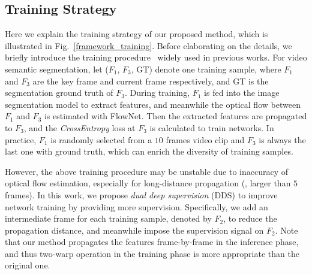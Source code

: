 \documentclass[journal]{IEEEtran}
\begin{document}
\subsection{Training Strategy}

Here we explain the training strategy of our proposed method, which is illustrated in Fig.~\ref{framework_training}. Before elaborating on the details, we briefly introduce the training procedure~\cite{zhu2017deep} widely used in previous works. For video semantic segmentation, let ($F_{1}$, $F_{3}$, GT) denote one training sample, where $F_{1}$ and $F_{3}$ are the key frame and current frame respectively, and GT is the segmentation ground truth of $F_{3}$. During training, $F_{1}$ is fed into the image segmentation model to extract features, and meanwhile the optical flow between $F_{1}$ and $F_{3}$ is estimated with FlowNet. Then the extracted features are propagated to $F_{3}$, and the \textit{CrossEntropy} loss at $F_3$ is calculated to train networks. In practice, $F_{1}$ is randomly selected from a $10$ frames video clip and $F_{3}$ is always the last one with ground truth, which can enrich the diversity of training samples.

However, the above training procedure may be unstable due to inaccuracy of optical flow estimation, especially for long-distance propagation (\eg, larger than $5$ frames). In this work, we propose \emph{dual deep supervision} (DDS) to improve network training by providing more supervision. Specifically, we add an intermediate frame for each training sample, denoted by $F_{2}$, to reduce the propagation distance, and meanwhile impose the supervision signal on $F_{2}$. Note that our method propagates the features frame-by-frame in the inference phase, and thus two-warp operation in the training phase is more appropriate than the original one.
\end{document}
